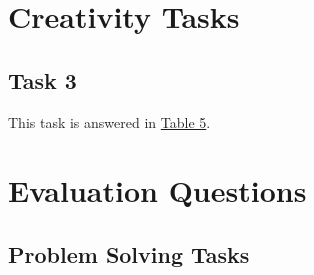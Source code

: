 \documentclass[stu,12pt,floatsintext]{apa7}
\begin{document}
\section{Creativity Tasks}

\subsection{Task 3}

This task is answered in \hyperref[tab:table4]{Table 5}.

\section{Evaluation Questions}

\subsection{Problem Solving Tasks}
\end{document}
